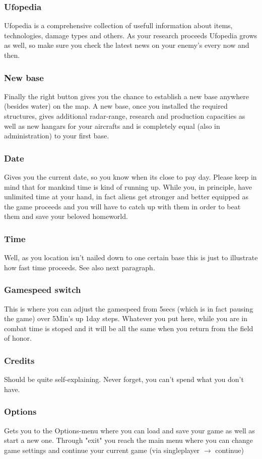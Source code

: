 \subsubsection{Ufopedia}
Ufopedia is a comprehensive collection of usefull information about items, technologies, damage types and others. As your research proceeds Ufopedia grows as well, so make sure you check the latest news on your enemy's every now and then.
\subsubsection{New base}
Finally the right button gives you the chance to establish a new base anywhere (besides water) on the map. A new base, once you installed the required structures, gives additional radar-range, research and production capacities as well as new hangars for your aircrafts and is completely equal (also in administration) to your first base.
\subsubsection{Date}
Gives you the current date, so you know when its close to pay day. Please keep in mind that for mankind time is kind of running up. While you, in principle, have unlimited time at your hand, in fact aliens get stronger and better equipped as the game proceeds and you will have to catch up with them in order to beat them and save your beloved homeworld.
\subsubsection{Time}
Well, as you location isn't nailed down to one certain base this is just to illustrate how fast time proceeds. See also next paragraph.
\subsubsection{Gamespeed switch}
This is where you can adjust the gamespeed from 5secs (which is in fact pausing the game) over 5Min's up 1day steps. Whatever you put here, while you are in combat time is stoped and it will be all the same when you return from the field of honor.
\subsubsection{Credits}
Should be quite self-explaining. Never forget, you can't spend what you don't have.
\subsubsection{Options}
Gets you to the Options-menu where you can load and save your game as well as start a new one.
Through "exit" you reach the main menu where you can change game settings and continue your current game (via singleplayer $\rightarrow$ continue)
